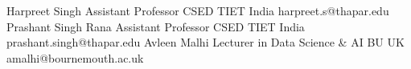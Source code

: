 

\begin{referees}
		{Harpreet Singh}
		{Assistant Professor CSED}
		{TIET India}
		{harpreet.s@thapar.edu}
		{Prashant Singh Rana}
		{Assistant Professor CSED}
		{TIET India}
		{prashant.singh@thapar.edu}
		{Avleen Malhi}
		{Lecturer in Data Science \& AI}
		{BU UK}
		{amalhi@bournemouth.ac.uk}
\end{referees}